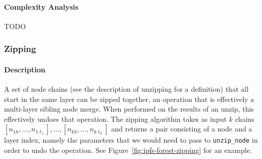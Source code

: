 \paragraph{Complexity Analysis}

TODO

\afterpage{\clearpage}
\newpage

\subsubsection{Zipping}

\paragraph{Description}

A set of node chains (see the description of unzipping for a definition) that all start in the same layer can be zipped together, an operation that is effectively a multi-layer sibling node merge. When performed on the results of an unzip, this effectively undoes that operation. The zipping algorithm takes as input $k$ chains $[n_{1h},\ldots,n_{1\ell_1}], \ldots, [n_{kh},\ldots,n_{k\ell_k}]$ and returns a pair consisting of a node and a layer index, namely the parameters that we would need to pass to \texttt{unzip_node} in order to undo the operation. See Figure~\ref{fig:ipfs-forest-zipping} for an example.


